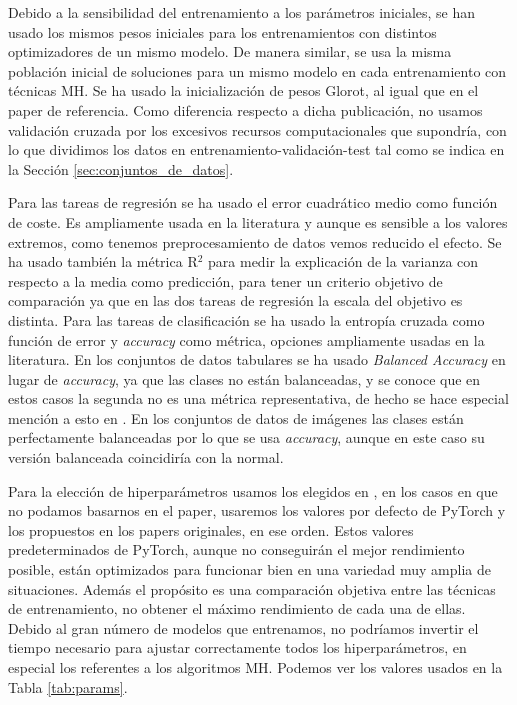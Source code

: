 Debido a la sensibilidad del entrenamiento a los parámetros iniciales, se han usado los mismos pesos iniciales para los entrenamientos con distintos optimizadores de un mismo modelo. De manera similar, se usa la misma población inicial de soluciones para un mismo modelo en cada entrenamiento con técnicas MH. Se ha usado la inicialización de pesos Glorot, al igual que en el paper de referencia. Como diferencia respecto a dicha publicación, no usamos validación cruzada por los excesivos recursos computacionales que supondría, con lo que dividimos los datos en entrenamiento-validación-test tal como se indica en la Sección \ref{sec:conjuntos_de_datos}.

Para las tareas de regresión se ha usado el error cuadrático medio como función de coste. Es ampliamente usada en la literatura y aunque es sensible a los valores extremos, como tenemos preprocesamiento de datos vemos reducido el efecto. Se ha usado también la métrica R$^2$ para medir la explicación de la varianza con respecto a la media como predicción, para tener un criterio objetivo de comparación ya que en las dos tareas de regresión la escala del objetivo es distinta. Para las tareas de clasificación se ha usado la entropía cruzada como función de error y \textit{accuracy} como métrica, opciones ampliamente usadas en la literatura. En los conjuntos de datos tabulares se ha usado \textit{Balanced Accuracy} en lugar de \textit{accuracy}, ya que las clases no están balanceadas, y se conoce que en estos casos la segunda no es una métrica representativa, de hecho se hace especial mención a esto en \cite{MHtrainingClase}. En los conjuntos de datos de imágenes las clases están perfectamente balanceadas por lo que se usa \textit{accuracy}, aunque en este caso su versión balanceada coincidiría con la normal.

Para la elección de hiperparámetros usamos los elegidos en \cite{MHtrainingClase}, en los casos en que no podamos basarnos en el paper, usaremos los valores por defecto de PyTorch y los propuestos en los papers originales, en ese orden. Estos valores predeterminados de PyTorch, aunque no conseguirán el mejor rendimiento posible, están optimizados para funcionar bien en una variedad muy amplia de situaciones. Además el propósito es una comparación objetiva entre las técnicas de entrenamiento, no obtener el máximo rendimiento de cada una de ellas. Debido al gran número de modelos que entrenamos, no podríamos invertir el tiempo necesario para ajustar correctamente todos los hiperparámetros, en especial los referentes a los algoritmos MH. Podemos ver los valores usados en la Tabla \ref{tab:params}.

